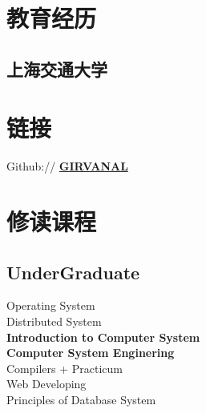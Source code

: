 \documentclass[]{deedy-resume-openfont}
\begin{document}
%
%
\lastupdated

%
%

%
%

\begin{minipage}[t]{0.3\textwidth} 


\section{教育经历} 
\sectionsep

\subsection{上海交通大学}
\sectionsep



\section{链接}
\sectionsep

Github:// \href{https://github.com/GIRVANAL}{\bf GIRVANAL} \\


\section{修读课程}
\subsection{UnderGraduate}
Operating System \\
Distributed System \\
\textbf{Introduction to Computer System} \\
\textbf{Computer System Enginering} \\
Compilers + Practicum \\
Web Developing \\
Principles of Database System  \\
\sectionsep


\end{minipage}
\end{document}
